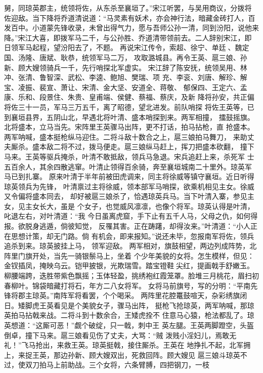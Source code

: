舅，同琼英郡主，统领将佐，从东杀至襄垣了。”宋江听罢，与吴用商议，分拨将
佐迎敌。当下降将乔道清说道：“马灵素有妖术，亦会神行法，暗藏金砖打人，百
发百中。小道蒙先锋收录，未曾出得气力，愿与吾师公孙一清，同到汾阳，说他来
降。”宋江大喜，即拨军马二千，与公孙胜、乔道清带领前去。二人辞别宋江，即
日领军马起程，望汾阳去了，不题。
再说宋江传令，索超、徐宁、单廷、魏定国、汤隆、唐斌、耿恭，统领军马二万，
攻取潞城县。再令王英、扈三娘、孙新、顾大嫂领骑兵一千，先行哨探北军虚实。
宋江辞了陈安抚，统领吴用、林冲、张清、鲁智深、武松、李逵、鲍旭、樊瑞、项
充、李衮、刘唐、解珍、解宝、凌振、裴宣、萧让、宋清、金大坚、安道全、蒋敬、
郁保四、王定六、孟康、乐和、段景住、朱贵、皇甫端、侯健、蔡福、蔡庆，及新
降将孙安，共正偏将佐三十一员，军马三万五千，离了昭德，望北进发。前队哨探
将佐王英等，已到襄垣县界，五阴山北，早遇北将叶清、盛本哨探到来。两军相撞，
擂鼓摇旗。北将盛本，立马当先。宋阵里王英骤马出阵，更不打话，拍马拈枪，直
抢盛本。两军呐喊，盛本挺枪纵马迎住。二将斗敌十数合之上，扈三娘拍马舞刀，
来助丈夫厮杀。盛本敌二将不过，拨马便走。扈三娘纵马赶上，挥刀把盛本砍翻，
撞下马来。王英等驱兵掩杀，叶清不敢抵敌，领兵马急退。宋兵追赶上来，杀死军
士五百余人，其余四散逃窜。叶清止领得百余骑，奔至襄垣城南二十里外。琼英军
马已到扎寨。
原来叶清于半年前被田虎调来，同主将徐威等镇守襄垣。近日听得琼英领兵为先锋，
叶清禀过主将徐威，领本部军马哨探，欲乘机相见主女。徐威又令偏将盛本同去，
却好被扈三娘杀了，恰遇琼英兵马。当下叶清入寨，参见主女，见主女长大，虽是
个女子，也觉威风凛凛，也像个将军。琼英认得是叶清，叱退左右，对叶清道：“我
今日虽离虎窟，手下止有五千人马，父母之仇，如何得报。欲脱身逃遁，倘彼知觉，
反罹其害。正在踌躇，却得汝来。”叶清道：“小人正在思想计策，却无门路。倘
有机会，即来报知。”说还未毕，忽报南军将佐，领兵追杀到来。琼英披挂上马，
领军迎敌。
两军相对，旗鼓相望，两边列成阵势，北阵里门旗开处，当先一骑银鬃马上，坐着
个少年美貌的女将。怎生模样，但见：
金钗插凤，掩映乌云。铠甲披银，光欺瑞雪。踏宝镫鞋尖红，提画戟手舒嫩玉。
柳腰端跨，迭胜带紫色飘摇；玉体轻盈，挑绣袍红霞笼罩。脸堆三月桃花，眉扫初
春柳叶。锦袋暗藏打将石，年方二八女将军。
女将马前旗号，写的分明：“平南先锋将郡主琼英。”南阵军将看罢，个个喝采。
两阵里花腔鼍鼓喧天，杂彩绣旗闭日。矮脚虎王英看见是个美貌女子，骤马出阵，
挺枪飞抢琼英，两军呐喊，那琼英拍马拈戟来战。二将斗到十数余合，王矮虎拴不
住意马心猿，枪法都乱了。琼英想道：“这厮可恶！”觑个破绽，只一戟，刺中王
英左腿。王英两脚蹬空，头盔倒卓，撞下马来。扈三娘看见伤了丈夫，大骂：“贼
泼贱小淫妇儿，焉敢无礼！”飞马抢出，来救王英。琼英挺戟，接住厮杀。王英在
地挣扎不起，北军拥上，来捉王英，那边孙新、顾大嫂双出，死救回阵。顾大嫂见
扈三娘斗琼英不过，使双刀拍马上前助战。三个女将，六条臂膊，四把钢刀，一枝
